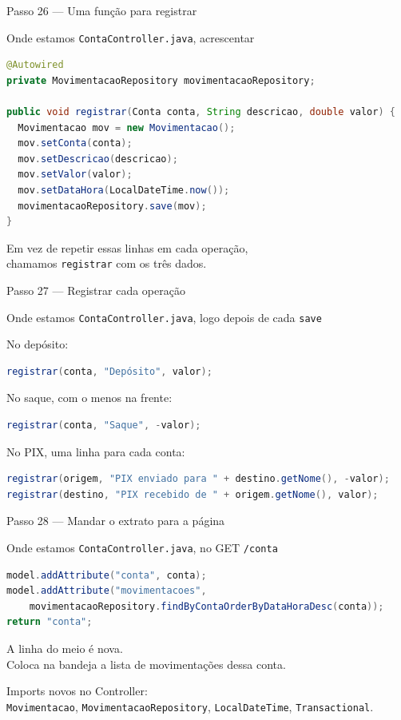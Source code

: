 \documentclass[aspectratio=169,11pt]{beamer}
\newcommand{\onde}[1]{%
  \begin{block}{Onde estamos}
    #1
  \end{block}
}
\begin{document}
\begin{frame}[fragile]{Passo 26 --- Uma função para registrar}
  \onde{\texttt{ContaController.java}, acrescentar}

\begin{lstlisting}[language=Java,basicstyle=\ttfamily\footnotesize]
@Autowired
private MovimentacaoRepository movimentacaoRepository;

public void registrar(Conta conta, String descricao, double valor) {
  Movimentacao mov = new Movimentacao();
  mov.setConta(conta);
  mov.setDescricao(descricao);
  mov.setValor(valor);
  mov.setDataHora(LocalDateTime.now());
  movimentacaoRepository.save(mov);
}
\end{lstlisting}

  Em vez de repetir essas linhas em cada operação,\\
  chamamos \texttt{registrar} com os três dados.
\end{frame}

\begin{frame}[fragile]{Passo 27 --- Registrar cada operação}
  \onde{\texttt{ContaController.java}, logo depois de cada \texttt{save}}

  No depósito:
\begin{lstlisting}[language=Java,basicstyle=\ttfamily\footnotesize]
registrar(conta, "Depósito", valor);
\end{lstlisting}

  No saque, com o menos na frente:
\begin{lstlisting}[language=Java,basicstyle=\ttfamily\footnotesize]
registrar(conta, "Saque", -valor);
\end{lstlisting}

  No PIX, uma linha para cada conta:
\begin{lstlisting}[language=Java,basicstyle=\ttfamily\footnotesize]
registrar(origem, "PIX enviado para " + destino.getNome(), -valor);
registrar(destino, "PIX recebido de " + origem.getNome(), valor);
\end{lstlisting}
\end{frame}

\begin{frame}[fragile]{Passo 28 --- Mandar o extrato para a página}
  \onde{\texttt{ContaController.java}, no GET \texttt{/conta}}

\begin{lstlisting}[language=Java,basicstyle=\ttfamily\footnotesize]
model.addAttribute("conta", conta);
model.addAttribute("movimentacoes",
    movimentacaoRepository.findByContaOrderByDataHoraDesc(conta));
return "conta";
\end{lstlisting}

  \vspace{0.4em}
  A linha do meio é nova.\\
  Coloca na bandeja a lista de movimentações dessa conta.

  \vspace{0.4em}
  Imports novos no Controller:\\
  \texttt{Movimentacao}, \texttt{MovimentacaoRepository},
  \texttt{LocalDateTime}, \texttt{Transactional}.
\end{frame}
\end{document}
